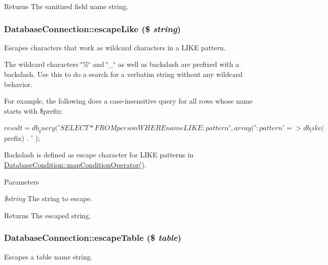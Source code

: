 \begin{DoxyReturn}{Returns}
The sanitized field name string. 
\end{DoxyReturn}
\hypertarget{classDatabaseConnection_a048eda663834d6303ce3e3d0fabc7e75}{
\subsubsection[{escapeLike}]{\setlength{\rightskip}{0pt plus 5cm}DatabaseConnection::escapeLike (\$ {\em string})}}
\label{classDatabaseConnection_a048eda663834d6303ce3e3d0fabc7e75}
Escapes characters that work as wildcard characters in a LIKE pattern.

The wildcard characters \char`\"{}\%\char`\"{} and \char`\"{}\_\-\char`\"{} as well as backslash are prefixed with a backslash. Use this to do a search for a verbatim string without any wildcard behavior.

For example, the following does a case-\/insensitive query for all rows whose name starts with \$prefix: 
\begin{DoxyCode}
 $result = db_query(
   'SELECT * FROM person WHERE name LIKE :pattern',
   array(':pattern' => db_like($prefix) . '%
 );
\end{DoxyCode}


Backslash is defined as escape character for LIKE patterns in \hyperlink{classDatabaseCondition_afb4e820b6d1719bf940526beef27dc7a}{DatabaseCondition::mapConditionOperator()}.


\begin{DoxyParams}{Parameters}
\item[{\em \$string}]The string to escape.\end{DoxyParams}
\begin{DoxyReturn}{Returns}
The escaped string. 
\end{DoxyReturn}
\hypertarget{classDatabaseConnection_a4ea565fbd6c6d1f258594b23a2e10e20}{
\subsubsection[{escapeTable}]{\setlength{\rightskip}{0pt plus 5cm}DatabaseConnection::escapeTable (\$ {\em table})}}
\label{classDatabaseConnection_a4ea565fbd6c6d1f258594b23a2e10e20}
Escapes a table name string.


